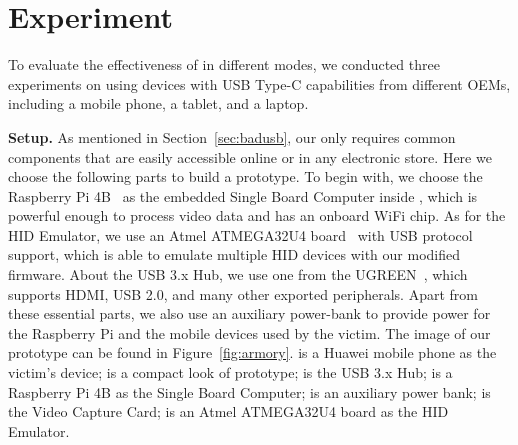 \section{Experiment}
\label{sec:experiment}


To evaluate the effectiveness of \tool in different modes, we conducted three
experiments on \tool using devices with USB Type-C capabilities from different
OEMs, including a mobile phone, a tablet, and a laptop.

\textbf{Setup.} 
As mentioned in Section~\ref{sec:badusb},
our \tool only requires common components that are easily accessible online or
in any electronic store. Here we choose the following parts to build a
prototype. To begin with, we choose the Raspberry Pi 4B~\cite{pi4b} as the embedded Single Board 
Computer inside \tool, which is powerful enough to process video data and has
an onboard WiFi chip. As for the HID Emulator, we use an Atmel ATMEGA32U4 board~\cite{atmel}
with USB protocol support, which is able to emulate multiple HID devices
with our modified firmware. About the USB 3.x Hub, we use one from the
UGREEN~\cite{ugreen}, which supports HDMI, USB 2.0, and many other exported peripherals.
Apart from these essential parts, we also use an auxiliary power-bank to
provide power for the Raspberry Pi and the mobile devices used by the victim.
The image of our \tool prototype can be found in Figure~\ref{fig:armory}.
 is a Huawei mobile phone as the victim's device;  is a compact look of \tool prototype;  is the USB 3.x Hub;  is a Raspberry Pi 4B as the Single Board Computer;  is an auxiliary power bank;  is the Video Capture Card;  is an Atmel ATMEGA32U4 board as the HID Emulator. 


